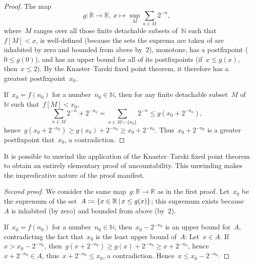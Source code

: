 \documentclass[oneside]{amsart}
\newcommand{\NN}{\mathbb{N}}
\newcommand{\RR}{\mathbb{R}}
\theoremstyle{definition}
\theoremstyle{plain}
\theoremstyle{remark}
\newcommand{\defeq}{\vcentcolon=}
\begin{document}
\begin{proof}The map
\[ g : \RR \longrightarrow \RR,\
  x \longmapsto \sup_M \sum_{n \in M} 2^{-n}, \]
where~$M$ ranges over all those finite detachable subsets of~$\NN$ such
that~$f[M] < x$, is well-defined (because the sets the suprema are taken of are
inhabited by zero and bounded from above by~$2$), monotone, has a postfixpoint
($0 \leq g(0)$), and has an upper bound for all of its postfixpoints (if~$x
\leq g(x)$, then~$x \leq 2$). By the Knaster--Tarski fixed point theorem, it
therefore has a greatest postfixpoint~$x_0$.

If~$x_0 = f(n_0)$ for a number~$n_0 \in \NN$, then for any finite detachable
subset~$M$ of~$\NN$ such that~$f[M] < x_0$,
\[ \sum_{n \in M} 2^{-n} + 2^{-n_0} = \sum_{n \in M \cup \{n_0\}} 2^{-n}
  \leq g(x_0 + 2^{-n_0}), \]
hence~$g(x_0 + 2^{-n_0}) \geq g(x_0) + 2^{-n_0} \geq x_0 + 2^{-n_0}$.
Thus~$x_0 + 2^{-n_0}$ is a greater postfixpoint that~$x_0$, a contradiction.
\end{proof}

It is possible to unwind the application of the Knaster--Tarski fixed point
theorem to obtain an entirely elementary proof of uncountability. This
unwinding makes the impredicative nature of the proof manifest.

\begin{proof}[Second proof]We consider the same map~$g : \RR \to \RR$ as in the
first proof. Let~$x_0$ be the supremum of the set~$A \defeq \{ x \in \RR \,|\,
x \leq g(x) \}$; this supremum exists because~$A$ is inhabited (by zero)
and bounded from above (by~$2$).

If~$x_0 = f(n_0)$ for a number~$n_0 \in \NN$, then~$x_0 - 2^{-n_0}$ is an
upper bound for~$A$, contradicting the fact that~$x_0$ is the least upper bound
of~$A$: Let~$x \in A$. If~$x > x_0 - 2^{-n_0}$, then~$g(x +
2^{-n_0}) \geq g(x) + 2^{-n_0} \geq x + 2^{-n_0}$, hence~$x + 2^{-n_0} \in A$,
thus~$x + 2^{-n_0} \leq x_0$, a contradiction. Hence~$x \leq x_0 - 2^{-n_0}$.
\end{proof}
\end{document}
